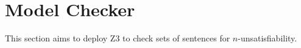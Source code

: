 \documentclass[a4paper, 11pt]{article} %
\begin{document}




\section{Model Checker}

This section aims to deploy Z3 to check sets of sentences for $n$-unsatisfiability.
\end{document}
